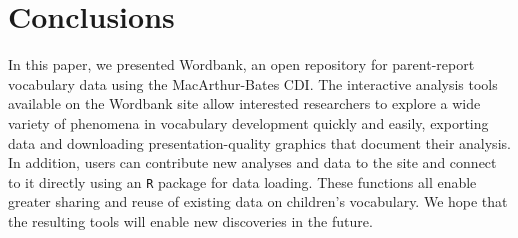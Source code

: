 \documentclass[man,noapacite]{apa}
\begin{document}
\section{Conclusions}

In this paper, we presented Wordbank, an open repository for parent-report vocabulary data using the MacArthur-Bates CDI. The interactive analysis tools available on the Wordbank site allow interested researchers to explore a wide variety of phenomena in vocabulary development quickly and easily, exporting data and downloading presentation-quality graphics that document their analysis. In addition, users can contribute new analyses and data to the site and connect to it directly using an \texttt{R} package for data loading. These functions all enable greater sharing and reuse of existing data on children's vocabulary. We hope that the resulting tools will enable new discoveries in the future.



\end{document}
